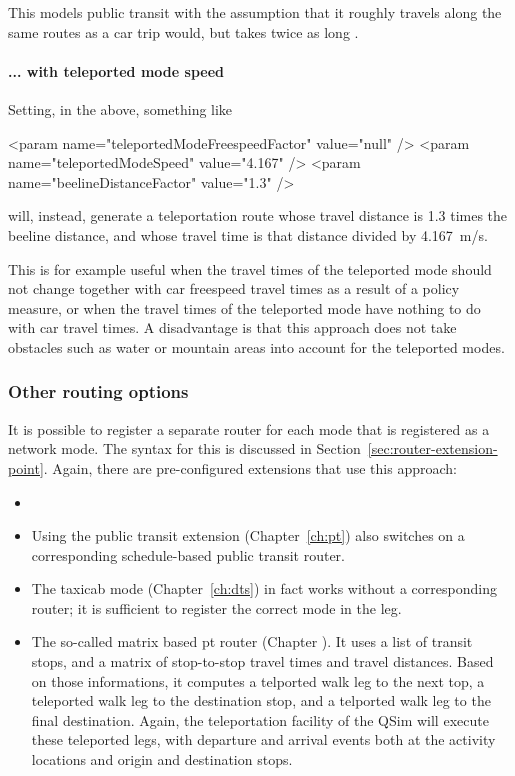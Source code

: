 This models public transit with the assumption that it roughly travels along the same routes as a car trip would, but takes twice as long \citep[\cf][]{Reinhold2006Konzeptzurintegrierten}.

\paragraph{... with teleported mode speed}  Setting, in the above, something like
\begin{xml}
      <param name="teleportedModeFreespeedFactor" value="null" />
      <param name="teleportedModeSpeed" value="4.167" />
      <param name="beelineDistanceFactor" value="1.3" />
\end{xml}
will, instead, generate a teleportation route whose travel distance is 1.3 times the beeline distance, and whose travel time is that distance divided by 4.167~m/s.

This is for example useful when the travel times of the teleported mode should not change together with car freespeed travel times as a result of a policy measure, or when the travel times of the teleported mode have nothing to do with car travel times.  A disadvantage is that this approach does not take obstacles such as water or mountain areas into account for the teleported modes.

\subsubsection{Other routing options}

It is possible to register a separate router for each mode that is registered as a network mode.  The syntax for this is discussed in Section~\ref{sec:router-extension-point}.  Again, there are pre-configured extensions that use this approach:
\begin{itemize}

\item {}

\item Using the public transit extension (Chapter~\ref{ch:pt}) also switches on a corresponding schedule-based public transit router.

\item The taxicab mode (Chapter~\ref{ch:dts}) in fact works without a corresponding router; it is sufficient to register the correct mode in the leg.  

\item The so-called matrix based pt router (Chapter ).  It uses a list of transit stops, and a matrix of stop-to-stop travel times and travel distances.  Based on those informations, it computes a telported walk leg to the next top, a teleported walk leg to the destination stop, and a telported walk leg to the final destination.  Again, the teleportation facility of the QSim will execute these teleported legs, with departure and arrival events both at the activity locations and origin and destination stops.

\end{itemize}

